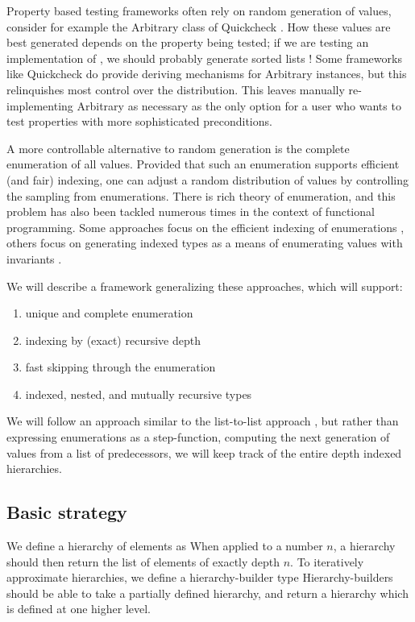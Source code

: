 Property based testing frameworks often rely on random generation of values, consider for example the Arbitrary class of Quickcheck \cite{quickcheck}. How these values are best generated depends on the property being tested; if we are testing an implementation of , we should probably generate sorted lists \cite{rest}! Some frameworks like Quickcheck do provide deriving mechanisms for Arbitrary instances, but this relinquishes most control over the distribution. This leaves manually re-implementing Arbitrary as necessary as the only option for a user who wants to test properties with more sophisticated preconditions.

A more controllable alternative to random generation is the complete enumeration of all values. Provided that such an enumeration supports efficient (and fair) indexing, one can adjust a random distribution of values by controlling the sampling from enumerations. There is rich theory of enumeration, and this problem has also been tackled numerous times in the context of functional programming. Some approaches focus on the efficient indexing of enumerations \cite{feat}, others focus on generating indexed types as a means of enumerating values with invariants \cite{uqenum}.

We will describe a framework generalizing these approaches, which will support:
\begin{enumerate}
    \item unique and complete enumeration
    \item indexing by (exact) recursive depth
    \item fast skipping through the enumeration
    \item indexed, nested, and mutually recursive types
\end{enumerate}

We will follow an approach similar to the list-to-list approach \cite{uqenum}, but rather than expressing enumerations as a step-function, computing the next generation of values from a list of predecessors, we will keep track of the entire depth indexed hierarchies.

\subsection{Basic strategy}
We define a hierarchy of elements as
When applied to a number $n$, a hierarchy should then return the list of elements of exactly depth $n$. To iteratively approximate hierarchies, we define a hierarchy-builder type
Hierarchy-builders should be able to take a partially defined hierarchy, and return a hierarchy which is defined at one higher level.

